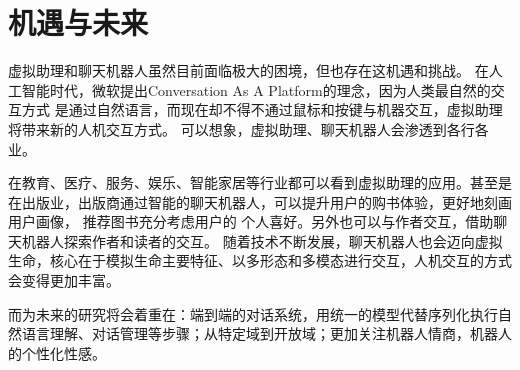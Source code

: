 \documentclass[UTF8]{ctexart}
\begin{document}
\section{机遇与未来}

虚拟助理和聊天机器人虽然目前面临极大的困境，但也存在这机遇和挑战。
在人工智能时代，微软提出Conversation As A Platform的理念，因为人类最自然的交互方式
是通过自然语言，而现在却不得不通过鼠标和按键与机器交互，虚拟助理将带来新的人机交互方式。
可以想象，虚拟助理、聊天机器人会渗透到各行各业。

在教育、医疗、服务、娱乐、智能家居等行业都可以看到虚拟助理的应用。甚至是在出版业，出版商通过智能的聊天机器人，可以提升用户的购书体验，更好地刻画用户画像，
推荐图书充分考虑用户的
个人喜好\cite{杨扬2020智能聊天机器人技术在出版业的创新应用及发展趋势}。另外也可以与作者交互，借助聊天机器人探索作者和读者的交互。
随着技术不断发展，聊天机器人也会迈向虚拟生命，核心在于模拟生命主要特征、以多形态和多模态进行交互，人机交互的方式会变得更加丰富。
\cite{邱楠2017从}


而为未来的研究将会着重在：端到端的对话系统，用统一的模型代替序列化执行自然语言理解、对话管理等步骤；从特定域到开放域；更加关注机器人情商，机器人的个性化性感\cite{张伟男2016}。


\end{document}
